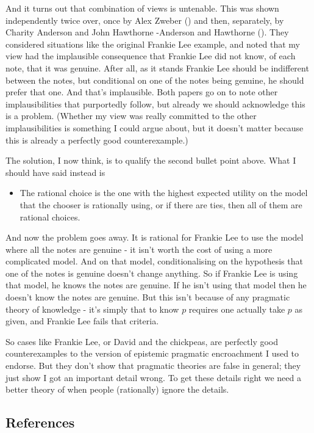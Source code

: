 \documentclass[
  11pt,
  letterpaper,
  DIV=11,
  numbers=noendperiod,
  oneside]{scrartcl}
\providecommand{\tightlist}{%
  \setlength{\itemsep}{0pt}\setlength{\parskip}{0pt}}\usepackage{longtable,booktabs,array}
\begin{document}
And it turns out that combination of views is untenable. This was shown
independently twice over, once by Alex Zweber
() and then, separately, by Charity
Anderson and John Hawthorne -Anderson and Hawthorne
(). They considered
situations like the original Frankie Lee example, and noted that my view
had the implausible consequence that Frankie Lee did not know, of each
note, that it was genuine. After all, as it stands Frankie Lee should be
indifferent between the notes, but conditional on one of the notes being
genuine, he should prefer that one. And that's implausible. Both papers
go on to note other implausibilities that purportedly follow, but
already we should acknowledge this is a problem. (Whether my view was
really committed to the other implausibilities is something I could
argue about, but it doesn't matter because this is already a perfectly
good counterexample.)

The solution, I now think, is to qualify the second bullet point above.
What I should have said instead is

\begin{itemize}
\tightlist
\item
  The rational choice is the one with the highest expected utility on
  the model that the chooser is rationally using, or if there are ties,
  then all of them are rational choices.
\end{itemize}

And now the problem goes away. It is rational for Frankie Lee to use the
model where all the notes are genuine - it isn't worth the cost of using
a more complicated model. And on that model, conditionalising on the
hypothesis that one of the notes is genuine doesn't change anything. So
if Frankie Lee is using that model, he knows the notes are genuine. If
he isn't using that model then he doesn't know the notes are genuine.
But this isn't because of any pragmatic theory of knowledge - it's
simply that to know \(p\) requires one actually take \(p\) as given, and
Frankie Lee fails that criteria.

So cases like Frankie Lee, or David and the chickpeas, are perfectly
good counterexamples to the version of epistemic pragmatic encroachment
I used to endorse. But they don't show that pragmatic theories are false
in general; they just show I got an important detail wrong. To get these
details right we need a better theory of when people (rationally) ignore
the details.

\subsection*{References}\label{references}
\end{document}
